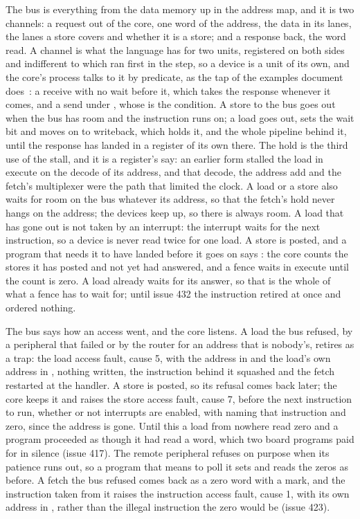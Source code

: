 \documentclass[journal,onecolumn,9pt]{IEEEtran}
\begin{document}
The bus is everything from the data memory up in the address map,
and it is two channels: a request out of the core, one word of the
address, the data in its lanes, the lanes a store covers and whether
it is a store; and a response back, the word read. A channel is
what the language has for two units, registered on both sides and
indifferent to which ran first in the step, so a device is a unit of
its own, and the core's process talks to it by predicate, as the tap
of the examples document does~\cite{examples}: a receive with no
wait before it, which takes the response whenever it comes, and a
send under , whose  is the condition. A
store to the bus goes out when the bus has room and the instruction
runs on; a load goes out, sets the wait bit and moves on to
writeback, which holds it, and the whole pipeline behind it, until
the response has landed in a register of its own there. The hold is
the third use of the stall,
and it is a register's say: an earlier form stalled the load in
execute on the decode of its address, and that decode, the address
add and the fetch's multiplexer were the path that limited the
clock. A load or a store also waits for room on the bus whatever its
address, so that the fetch's hold never hangs on the address; the
devices keep up, so there is always room. A load that has gone out
is not taken by an interrupt: the interrupt waits for the next
instruction, so a device is never read twice for one load. A store
is posted, and a program that needs it to have landed before it
goes on says : the core counts the stores it has posted
and not yet had answered, and a fence waits in execute until the
count is zero. A load already waits for its answer, so that is the
whole of what a fence has to wait for; until issue 432 the
instruction retired at once and ordered nothing.

The bus says how an access went, and the core listens. A load the
bus refused, by a peripheral that failed or by the router for an
address that is nobody's, retires as a trap: the load access fault,
cause 5, with the address in  and the load's own address
in , nothing written, the instruction behind it squashed
and the fetch restarted at the handler. A store is posted, so its
refusal comes back later; the core keeps it and raises the store
access fault, cause 7, before the next instruction to run, whether or
not interrupts are enabled, with  naming that instruction
and  zero, since the address is gone. Until this a load
from nowhere read zero and a program proceeded as though it had read
a word, which two board programs paid for in silence (issue 417).
The remote peripheral refuses on purpose when its patience runs out,
so a program that means to poll it sets  and reads
the zeros as before. A fetch the bus refused comes back as a zero
word with a mark, and the instruction taken from it raises the
instruction access fault, cause 1, with its own address in
, rather than the illegal instruction the zero would be
(issue 423).
\end{document}
